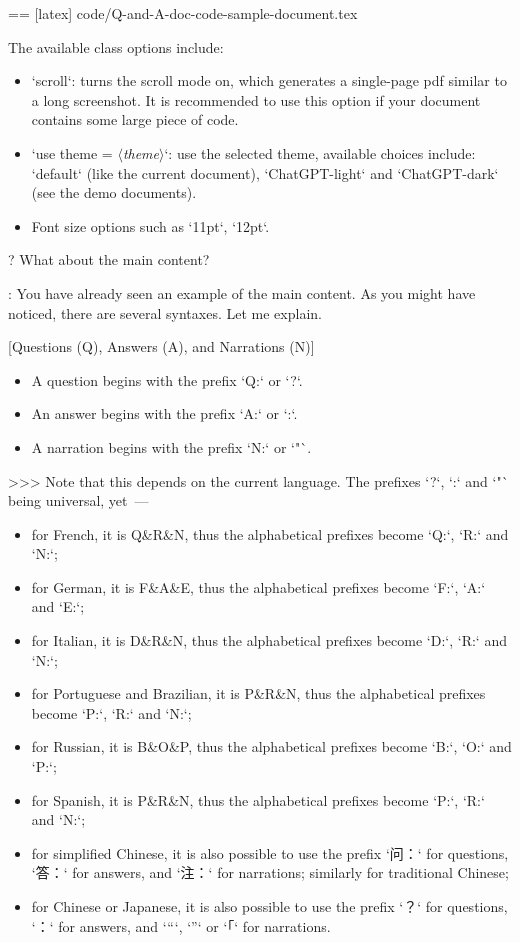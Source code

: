 \documentclass[%
  use style = classical,
  scroll,
]{Q-and-A}
\newcommand{\meta}[1]{$\langle${\normalfont\itshape#1}$\rangle$}
\begin{document}
  == [latex] {code/Q-and-A-doc-code-sample-document.tex}

  The available class options include:
  \begin{itemize}
    \item `scroll`: turns the scroll mode on, which generates a single-page pdf similar to a long screenshot. It is recommended to use this option if your document contains some large piece of code.
    \item `use theme = \meta{theme}`: use the selected theme, available choices include: `default` (like the current document), `ChatGPT-light` and `ChatGPT-dark` (see the demo documents).
    \item Font size options such as `11pt`, `12pt`.
  \end{itemize}

?
  What about the main content?

:
  You have already seen an example of the main content. As you might have noticed, there are several syntaxes. Let me explain.

  [Questions (Q), Answers (A), and Narrations (N)]
  \begin{itemize}
    \item A question begins with the prefix `Q:` or `?`.
    \item An answer begins with the prefix `A:` or `:`.
    \item A narration begins with the prefix `N:` or `"`.
  \end{itemize}
  >>> Note that this depends on the current language. The prefixes `?`, `:` and `"` being universal, yet~—
  \begin{itemize}
    \item for French, it is Q\&R\&N, thus the alphabetical prefixes become `Q:`, `R:` and `N:`;
    \item for German, it is F\&A\&E, thus the alphabetical prefixes become `F:`, `A:` and `E:`;
    \item for Italian, it is D\&R\&N, thus the alphabetical prefixes become `D:`, `R:` and `N:`;
    \item for Portuguese and Brazilian, it is P\&R\&N, thus the alphabetical prefixes become `P:`, `R:` and `N:`;
    \item for Russian, it is B\&O\&P, thus the alphabetical prefixes become `B:`, `O:` and `P:`;
    \item for Spanish, it is P\&R\&N, thus the alphabetical prefixes become `P:`, `R:` and `N:`;
    \item for simplified Chinese, it is also possible to use the prefix `问：` for questions, `答：` for answers, and `注：` for narrations; similarly for traditional Chinese;
    \item for Chinese or Japanese, it is also possible to use the prefix `？` for questions, `：` for answers, and `“`, `”` or `「` for narrations.
  \end{itemize}
\end{document}
